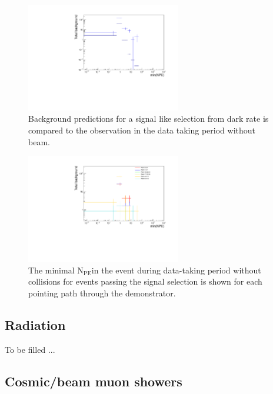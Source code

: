 \documentclass[12pt]{article}
\newcommand{\npe} {\mbox{\ensuremath{\textrm{N}_\textrm{PE}}\xspace}}
\begin{document}
\begin{figure}[ht!]
    \centering
    \includegraphics[width=0.6\textwidth]{figures/predictionAndMeasurementTimeWindow15}
    \caption{\label{fig:darkRate} Background predictions for a signal like selection
    from dark rate is compared to the observation in the data taking period without beam.} 
\end{figure}


\begin{figure}[ht!]
    \centering
    \includegraphics[width=0.6\textwidth]{figures/perPathPlotsNoBeam.pdf}
    \caption{\label{fig:perPathPlot} The minimal \npe in the event during data-taking period without
    collisions for events passing the signal selection is shown for each pointing path 
    through the demonstrator.}
\end{figure}

\subsection{Radiation}

To be filled ...

\subsection{Cosmic/beam muon showers}
\end{document}
